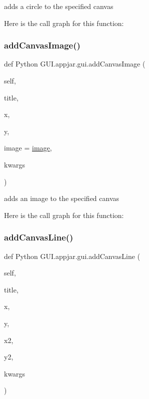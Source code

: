 \begin{DoxyVerb}adds a circle to the specified canvas \end{DoxyVerb}
 Here is the call graph for this function\+:
\mbox{\label{class_python_01_g_u_i_1_1appjar_1_1gui_aa5272447b90193be89f1a6bd77219abe}} 
\subsubsection{\texorpdfstring{add\+Canvas\+Image()}{addCanvasImage()}}
{\footnotesize\ttfamily def Python G\+U\+I.\+appjar.\+gui.\+add\+Canvas\+Image (\begin{DoxyParamCaption}\item[{}]{self,  }\item[{}]{title,  }\item[{}]{x,  }\item[{}]{y,  }\item[{}]{image = {\ttfamily \hyperlink{class_python_01_g_u_i_1_1appjar_1_1gui_a17243935a5285eba9b2b6b0eb3e9d86a}{image}},  }\item[{}]{kwargs }\end{DoxyParamCaption})}

\begin{DoxyVerb}adds an image to the specified canvas \end{DoxyVerb}
 Here is the call graph for this function\+:
\mbox{\label{class_python_01_g_u_i_1_1appjar_1_1gui_a09845cb7cec3f293e009538da74a8705}} 
\subsubsection{\texorpdfstring{add\+Canvas\+Line()}{addCanvasLine()}}
{\footnotesize\ttfamily def Python G\+U\+I.\+appjar.\+gui.\+add\+Canvas\+Line (\begin{DoxyParamCaption}\item[{}]{self,  }\item[{}]{title,  }\item[{}]{x,  }\item[{}]{y,  }\item[{}]{x2,  }\item[{}]{y2,  }\item[{}]{kwargs }\end{DoxyParamCaption})}

